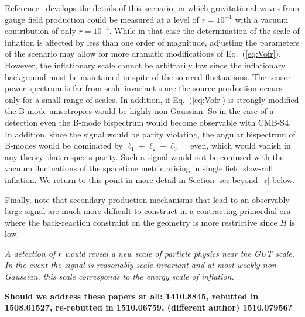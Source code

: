 Reference~\cite{Namba:2015gja} develops the details of this scenario, in which gravitational waves from gauge field production could be measured at a level of $r=10^{-1}$ with a vacuum contribution of only $r=10^{-4}$. While in that case the determination of the scale of inflation is affected by less than one order of magnitude, adjusting the parameters of the scenario may allow for more dramatic modifications of Eq.~(\ref{eq:Vofr}). However, the inflationary scale cannot be arbitrarily low since the inflationary background must be maintained in spite of the sourced fluctuations. The tensor power spectrum is far from scale-invariant since the source production occurs only for a small range of scales. In addition, if Eq.~(\ref{eq:Vofr}) is strongly modified the B-mode anisotropies would be highly non-Gaussian. So in the case of a detection even the B-mode bispectrum would become observable with CMB-S4. In addition, since the signal would be parity violating, the angular bispectrum of B-modes would be dominated by $\ell_1+\ell_2+\ell_3=$even, which would vanish in any theory that respects parity. Such a signal would not be confused with the vacuum fluctuations of the spacetime metric arising in single field slow-roll inflation. We return to this point in more detail in Section \ref{sec:beyond_r} below.

Finally, note that secondary production mechanisms that lead to an observably large signal are much more difficult to construct in a contracting primordial era where the back-reaction constraint on the geometry is more restrictive since $H$ is low. 

{\it A detection of $r$ would reveal a new scale of particle physics near the GUT scale. In the event the signal is reasonably scale-invariant and at most weakly non-Gaussian, this scale corresponds to the energy scale of inflation. }

{\bf Should we address these papers at all: 1410.8845, rebutted in 1508.01527, re-rebutted in 1510.06759, (different author) 1510.07956?}


